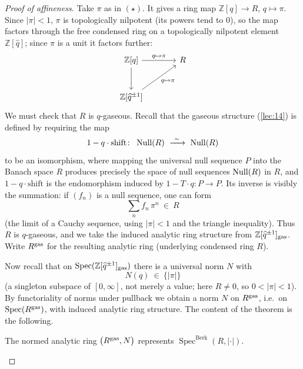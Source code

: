 \begin{proof}[Proof of affineness]
Take $\pi$ as in $(\star)$. It gives a ring map $\mathbb Z[q]\to R$,
$q\mapsto\pi$. Since $\lvert\pi\rvert<1$, $\pi$ is topologically nilpotent (its
powers tend to $0$), so the map factors through the free condensed ring on a
topologically nilpotent element $\mathbb Z[\widehat q]$; since $\pi$ is a unit it
factors further:
\begin{equation*}
\begin{tikzcd}[column sep=large, row sep=large]
\mathbb Z[q] \arrow[r, "q\mapsto\pi"] \arrow[d] & R \\
\mathbb Z[\widehat q^{\pm1}] \arrow[ur, "q\mapsto\pi"'] &
\end{tikzcd}
\end{equation*}
We must check that $R$ is $q$-gaseous. Recall that the gaseous structure
(\cref{lec:14}) is defined by requiring the map
\begin{equation*}
1-q\cdot\mathrm{shift}\colon\ \Null(R)\ \xrightarrow{\ \sim\ }\ \Null(R)
\end{equation*}
to be an isomorphism, where mapping the universal null sequence $P$ into the
Banach space $R$ produces precisely the space of null sequences $\operatorname{Null}(R)$ in
$R$, and $1-q\cdot\mathrm{shift}$ is the endomorphism induced by
$1-T\cdot q\colon P\to P$. Its inverse is visibly the summation: if $(f_n)$ is a
null sequence, one can form
\begin{equation*}
\sum_n f_n\,\pi^n\ \in\ R
\end{equation*}
(the limit of a Cauchy sequence, using $\lvert\pi\rvert<1$ and the triangle
inequality). Thus $R$ is $q$-gaseous, and we take the induced analytic ring
structure from $\mathbb Z[\widehat q^{\pm1}]_{\mathrm{gas}}$. Write $R^{\mathrm{gas}}$ for the
resulting analytic ring (underlying condensed ring $R$).

Now recall that on $\operatorname{Spec}(\mathbb Z[\widehat q^{\pm1}]_{\mathrm{gas}})$ there
is a universal norm $N$ with
\begin{equation*}
N(q)\ \in\ \{\lvert\pi\rvert\}
\end{equation*}
(a singleton subspace of $[0,\infty]$, not merely a value; here $R\ne0$, so
$0<\lvert\pi\rvert<1$). By functoriality of norms under pullback we obtain a norm
$N$ on $R^{\mathrm{gas}}$, i.e.\ on
$\operatorname{Spec}(R^{\mathrm{gas}})$, with induced analytic ring structure. The
content of the theorem is the following.

\begin{claim}
\label{claim:23:represents}
The normed analytic ring $\bigl(R^{\mathrm{gas}},N\bigr)$ represents
$\operatorname{Spec}^{\mathrm{Berk}}(R,\lvert\cdot\rvert)$.
\end{claim}


\end{proof}
